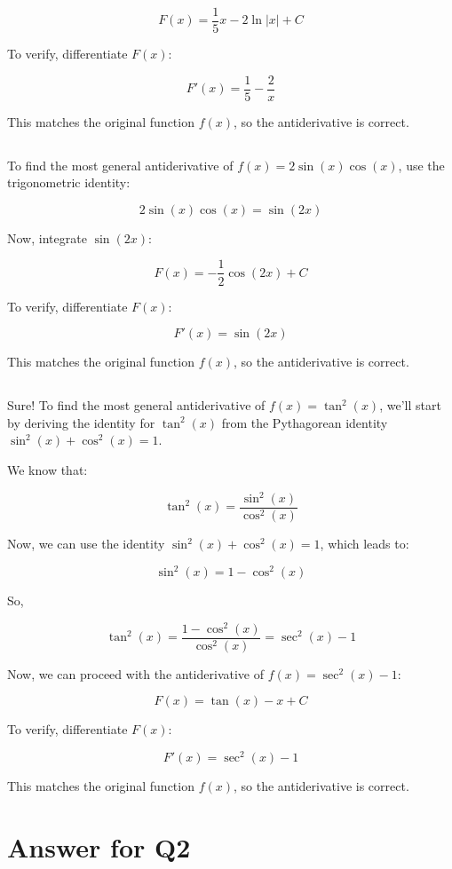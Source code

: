 \documentclass{article}
\begin{document}
\[
F(x) = \frac{1}{5}x - 2\ln|x| + C
\]

To verify, differentiate \( F(x) \):

\[
F'(x) = \frac{1}{5} - \frac{2}{x}
\]

This matches the original function \( f(x) \), so the antiderivative is correct.
\subsection{}
To find the most general antiderivative of \( f(x) = 2\sin(x)\cos(x) \), use the trigonometric identity:

\[
2\sin(x)\cos(x) = \sin(2x)
\]

Now, integrate \( \sin(2x) \):

\[
F(x) = -\frac{1}{2}\cos(2x) + C
\]

To verify, differentiate \( F(x) \):

\[
F'(x) = \sin(2x)
\]

This matches the original function \( f(x) \), so the antiderivative is correct.
\subsection{}
Sure! To find the most general antiderivative of \( f(x) = \tan^2(x) \), we'll start by deriving the identity for \( \tan^2(x) \) from the Pythagorean identity \( \sin^2(x) + \cos^2(x) = 1 \).

We know that:

\[
\tan^2(x) = \frac{\sin^2(x)}{\cos^2(x)}
\]

Now, we can use the identity \( \sin^2(x) + \cos^2(x) = 1 \), which leads to:

\[
\sin^2(x) = 1 - \cos^2(x)
\]

So,

\[
\tan^2(x) = \frac{1 - \cos^2(x)}{\cos^2(x)} = \sec^2(x) - 1
\]

Now, we can proceed with the antiderivative of \( f(x) = \sec^2(x) - 1 \):

\[
F(x) = \tan(x) - x + C
\]

To verify, differentiate \( F(x) \):

\[
F'(x) = \sec^2(x) - 1
\]

This matches the original function \( f(x) \), so the antiderivative is correct.
\section{Answer for Q2}
\end{document}
